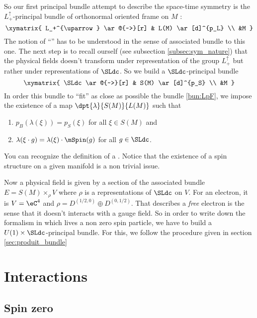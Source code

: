 So our first principal bundle attempt to describe the space-time symmetry is the $L_+^{\uparrow}$-principal bundle of orthonormal oriented frame on $M$ :
 \begin{equation}\label{bun:LpF}
\xymatrix{
    L_+^{\uparrow}  \ar@{~>}[r] & L(M) \ar[d]^{p_L} \\
    &M
  }
\end{equation}
The notion of ``'' has to be understood in the sense of associated bundle to this one. The next step is to recall ourself (see subsection \ref{subsec:sym_nature}) that the physical fields doesn't transform under representation of the group $L_+^{\uparrow}$ but rather under representations of $\SLdc$. So we build a $\SLdc$-principal bundle
 \[
\xymatrix{
    \SLdc  \ar@{~>}[r] & S(M) \ar[d]^{p_S} \\
    &M
  }
\]
In order this bundle to ``fit''{} as close as possible the bundle \eqref{bun:LpF}, we impose the existence of a map $\dpt{\lambda}{S(M)}{L(M)}$ such that

\begin{enumerate}
\item $p_B(\lambda(\xi))=p_S(\xi)$ for all $\xi\in S(M)$ and
\item $\lambda(\xi\cdot g)=\lambda(\xi)\cdot\mSpin(g)$ for all $g\in\SLdc$.
\end{enumerate}
You can recognize the definition of a \label{pg_spinenphyz}. Notice that the existence of a spin structure on a given manifold is a non trivial issue.

Now a physical field is given by a section of the associated bundle $E=S(M)\times_{\rho} V$ where $\rho$ is a representations of $\SLdc$ on $V$. For an electron, it is $V=\eC^4$ and $\rho=D^{(1/2,0)}\oplus D^{(0,1/2)}$. That describes a \emph{free} electron is the sense that it doesn't interacts with a gauge field. So in order to write down the formalism in which lives a non zero spin particle, we have to build a $U(1)\times\SLdc$-principal bundle. For this, we follow the procedure given in section \ref{sec:produit_bundle}

\section{Interactions}

\subsection{Spin zero}

